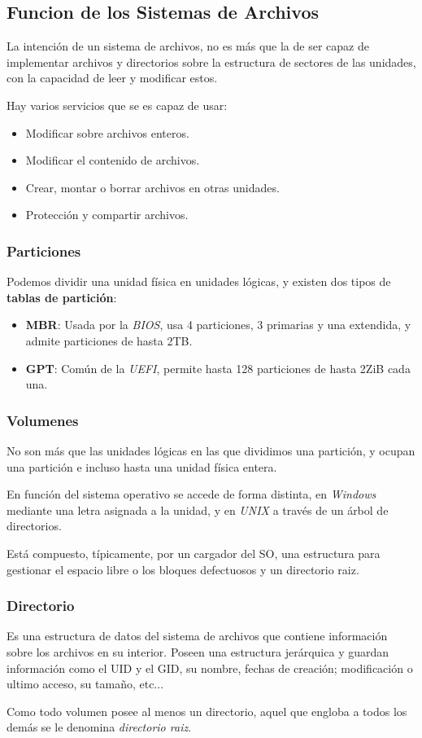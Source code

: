 \subsection{Funcion de los Sistemas de Archivos}
\noindent La intención de un sistema de archivos, no es más que la de ser capaz de implementar archivos y directorios sobre la estructura de sectores de las unidades, con la capacidad de leer y modificar estos.
\par \noindent Hay varios servicios que se es capaz de usar:
\begin{itemize}
        \item Modificar sobre archivos enteros.
        \item Modificar el contenido de archivos.
        \item Crear, montar o borrar archivos en otras unidades.
        \item Protección y compartir archivos.
\end{itemize}
\subsubsection{Particiones}
\noindent Podemos dividir una unidad física en unidades lógicas, y existen dos tipos de \textbf{tablas de partición}:
\begin{itemize}
        \item \textbf{MBR}: Usada por la \textit{BIOS}, usa 4 particiones, 3 primarias y una extendida, y admite particiones de hasta 2TB.
        \item \textbf{GPT}: Común de la \textit{UEFI}, permite hasta 128 particiones de hasta 2ZiB cada una.
\end{itemize}
\subsubsection{Volumenes}
\noindent No son más que las unidades lógicas en las que dividimos una partición, y ocupan una partición e incluso hasta una unidad física entera. \par \noindent En función del sistema operativo se accede de forma distinta, en \textit{Windows} mediante una letra asignada a la unidad, y en \textit{UNIX} a través de un árbol de directorios.
\par \noindent Está compuesto, típicamente, por un cargador del SO, una estructura para gestionar el espacio libre o los bloques defectuosos y un directorio raiz.
\subsubsection{Directorio}
\noindent Es una estructura de datos del sistema de archivos que contiene información sobre los archivos en su interior. Poseen una estructura jerárquica y guardan información como el UID y el GID, su nombre, fechas de creación; modificación o ultimo acceso, su tamaño, etc...
\par \noindent Como todo volumen posee al menos un directorio, aquel que engloba a todos los demás se le denomina \textit{directorio raiz}.
